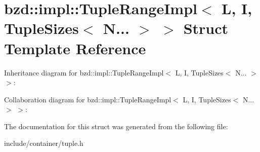 \hypertarget{structbzd_1_1impl_1_1TupleRangeImpl_3_01L_00_01I_00_01TupleSizes_3_01N_8_8_8_01_4_01_4}{}\section{bzd\+:\+:impl\+:\+:Tuple\+Range\+Impl$<$ L, I, Tuple\+Sizes$<$ N... $>$ $>$ Struct Template Reference}
\label{structbzd_1_1impl_1_1TupleRangeImpl_3_01L_00_01I_00_01TupleSizes_3_01N_8_8_8_01_4_01_4}


Inheritance diagram for bzd\+:\+:impl\+:\+:Tuple\+Range\+Impl$<$ L, I, Tuple\+Sizes$<$ N... $>$ $>$\+:


Collaboration diagram for bzd\+:\+:impl\+:\+:Tuple\+Range\+Impl$<$ L, I, Tuple\+Sizes$<$ N... $>$ $>$\+:


The documentation for this struct was generated from the following file\+:\begin{DoxyCompactItemize}
\item 
include/container/tuple.\+h\end{DoxyCompactItemize}
